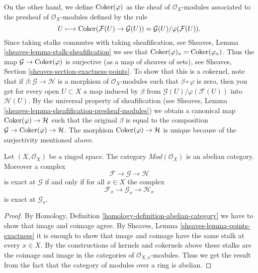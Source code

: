\medskip\noindent
On the other hand, we define
$\mathop{\mathrm{Coker}}(\varphi)$ as the sheaf of $\mathcal{O}_X$-modules
associated to the presheaf of $\mathcal{O}_X$-modules defined
by the rule
$$
U
\longmapsto
\mathop{\mathrm{Coker}}(\mathcal{F}(U)\to \mathcal{G}(U)) =
\mathcal{G}(U)/\varphi(\mathcal{F}(U)).
$$
Since taking stalks commutes with taking sheafification, see
Sheaves, Lemma \ref{sheaves-lemma-stalk-sheafification} we
see that $\mathop{\mathrm{Coker}}(\varphi)_x = \mathop{\mathrm{Coker}}(\varphi_x)$.
Thus the map $\mathcal{G} \to \mathop{\mathrm{Coker}}(\varphi)$ is surjective
(as a map of sheaves of sets),
see Sheaves, Section \ref{sheaves-section-exactness-points}.
To show that this is a cokernel, note that if
$\beta : \mathcal{G} \to \mathcal{H}$ is a morphism of $\mathcal{O}_X$-modules
such that $\beta \circ \varphi$ is zero, then you get for every
open $U \subset X$ a map induced by $\beta$ from
$\mathcal{G}(U)/\varphi(\mathcal{F}(U))$ into $\mathcal{H}(U)$.
By the universal property of sheafification (see
Sheaves, Lemma \ref{sheaves-lemma-sheafification-presheaf-modules})
we obtain a canonical map $\mathop{\mathrm{Coker}}(\varphi) \to \mathcal{H}$
such that the original $\beta$ is equal to
the composition
$\mathcal{G} \to \mathop{\mathrm{Coker}}(\varphi) \to \mathcal{H}$.
The morphism $\mathop{\mathrm{Coker}}(\varphi) \to \mathcal{H}$ is unique
because of the surjectivity mentioned above.

\begin{lemma}
\label{lemma-abelian}
Let $(X, \mathcal{O}_X)$ be a ringed space. The category
$\textit{Mod}(\mathcal{O}_X)$ is an abelian category. Moreover
a complex
$$
\mathcal{F} \to \mathcal{G} \to \mathcal{H}
$$
is exact at $\mathcal{G}$ if and only if for all $x \in X$ the
complex
$$
\mathcal{F}_x \to \mathcal{G}_x \to \mathcal{H}_x
$$
is exact at $\mathcal{G}_x$.
\end{lemma}

\begin{proof}
By Homology, Definition \ref{homology-definition-abelian-category}
we have to show that image and coimage agree. By Sheaves,
Lemma \ref{sheaves-lemma-points-exactness} it is enough to show
that image and coimage have the same stalk at every $x \in X$.
By the constructions of kernels and cokernels above these stalks
are the coimage and image in the categories of $\mathcal{O}_{X, x}$-modules.
Thus we get the result from the fact that the category of modules
over a ring is abelian.
\end{proof}


